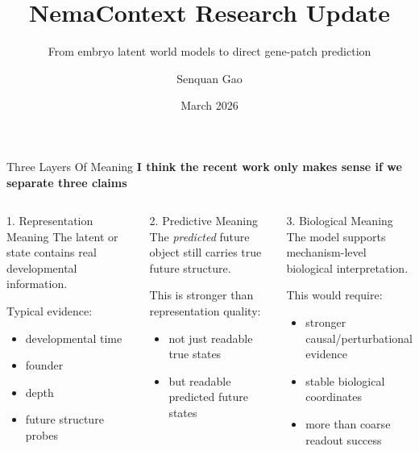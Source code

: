 \documentclass[aspectratio=169,11pt]{beamer}
\title[NemaContext Update]{NemaContext Research Update}
\subtitle{From embryo latent world models to direct gene-patch prediction}
\author{Senquan Gao}
\date{March 2026}
\begin{document}
\begin{frame}
\titlepage
\end{frame}

\begin{frame}{Three Layers Of Meaning}
\textbf{I think the recent work only makes sense if we separate three claims}

\vspace{0.6em}
\begin{columns}[T]
\begin{block}{1. Representation Meaning}
\small
The latent or state contains real developmental information.

\vspace{0.4em}
Typical evidence:
\begin{itemize}
    \item developmental time
    \item founder
    \item depth
    \item future structure probes
\end{itemize}
\end{block}

\begin{block}{2. Predictive Meaning}
\small
The \emph{predicted} future object still carries true future structure.

\vspace{0.4em}
This is stronger than representation quality:
\begin{itemize}
    \item not just readable true states
    \item but readable predicted future states
\end{itemize}
\end{block}

\begin{block}{3. Biological Meaning}
\small
The model supports mechanism-level biological interpretation.

\vspace{0.4em}
This would require:
\begin{itemize}
    \item stronger causal/perturbational evidence
    \item stable biological coordinates
    \item more than coarse readout success
\end{itemize}
\end{block}
\end{columns}
\end{frame}
\end{document}
